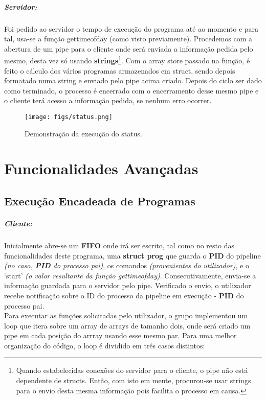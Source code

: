 \documentclass{report}
\begin{document}
\subparagraph{Servidor:}

Foi pedido ao servidor o tempo de execução do programa até ao momento e para tal, usa-se a função gettimeofday (como visto previamente). Procedemos com a abertura de um pipe para o cliente onde será enviada a informação pedida pelo mesmo, desta vez só usando \textbf{strings}\footnote{Quando estabelecidas conexões do servidor para o cliente, o pipe não está dependente de structs. Então, com isto em mente, procurou-se usar strings para o envio desta mesma informação pois facilita o processo em causa.}.
Com o array store passado na função, é feito o cálculo dos vários programas armazenados em struct, sendo depois formatado numa string e enviado pelo pipe acima criado. Depois do ciclo ser dado como terminado, o processo é encerrado com o encerramento desse mesmo pipe e o cliente terá acesso a informação pedida, se nenhum erro ocorrer.\\

\begin{figure}[h]
    \centering
    \texttt{[image: figs/status.png]}
    \caption{Demonstração da execução do status.}
    \label{f}
\end{figure}

\section{Funcionalidades Avançadas}
\subsection{Execução Encadeada de Programas}

\subparagraph{Cliente:} Inicialmente abre-se um \textbf{FIFO} onde irá ser escrito, tal como no resto das funcionalidades deste programa, uma \textbf{struct prog} que guarda o \textbf{PID} do pipeline \textit{(no caso, \textbf{PID} do processo pai)}, os comandos \textit{(provenientes do utilizador)}, e o ‘start’ \textit{(o valor resultante da função gettimeofday)}. Consecutivamente, envia-se a informação guardada para o servidor pelo pipe. Verificado o envio, o utilizador recebe notificação sobre o ID do processo da pipeline em execução - \textbf{PID} do processo pai.\\

\newpage
Para executar as funções solicitadas pelo utilizador, o grupo implementou um loop que itera sobre um array de arrays de tamanho dois, onde será criado um pipe em cada posição do arrray usando esse mesmo par. Para uma melhor organização do código, o loop é dividido em três casos distintos:
\end{document}
